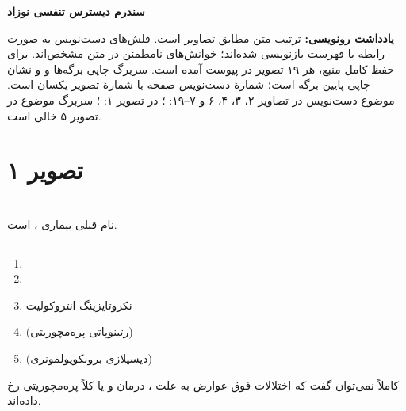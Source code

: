 \documentclass[12pt,a4paper]{article}
\begin{document}
\fi
\providecommand{\RDSunclear}[1]{\textbf{[خوانش نامطمئن: #1]}}
\providecommand{\RDSpage}[2]{\clearpage\section*{تصویر #1}\noindent\lr{\texttt{#2}}\par}
\providecommand{\RDSen}[1]{\lr{#1}}
\providecommand{\RDSmath}[1]{\lr{\(#1\)}}

\begin{center}
{\Large\bfseries سندرم دیسترس تنفسی نوزاد}\par
{}\par
{}
\end{center}
\textbf{یادداشت رونویسی:} ترتیب متن مطابق تصاویر است. فلش‌های دست‌نویس به صورت رابطه یا فهرست بازنویسی شده‌اند؛ خوانش‌های نامطمئن در متن مشخص‌اند. برای حفظ کامل منبع، هر ۱۹ تصویر در پیوست آمده است. سربرگ چاپی برگه‌ها  و  و نشان چاپی پایین برگه  است؛ شمارهٔ دست‌نویس صفحه با شمارهٔ تصویر یکسان است. موضوع دست‌نویس در تصاویر ۲، ۳، ۴، ۶ و ۷–۱۹: ؛ در تصویر ۱: ؛ سربرگ موضوع در تصویر ۵ خالی است.

\RDSpage{۱}{pic01.jpg}
\section*{}
نام قبلی بیماری ،  است.
\subsection*{}
\begin{enumerate}
\item {}
\item {}
\item نکروتایزینگ انتروکولیت
\item {} (رتینوپاتی پره‌مچوریتی)
\item {} (دیسپلازی برونکوپولمونری)
\end{enumerate}
کاملاً نمی‌توان گفت که اختلالات فوق عوارض به علت ، درمان  و یا کلاً پره‌مچوریتی رخ داده‌اند.
\end{document}

